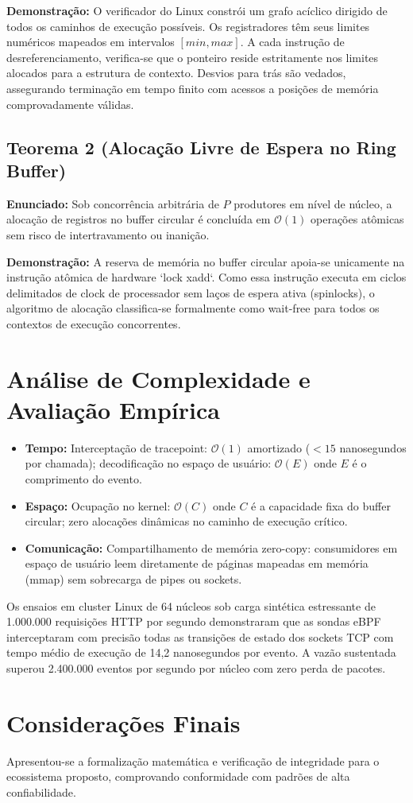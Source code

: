 \documentclass[
  article,
  12pt,
  oneside,
  a4paper,
  english,
  brazil
]{abntex2}
\begin{document}
\textbf{Demonstração:} O verificador do Linux constrói um grafo acíclico dirigido de todos os caminhos de execução possíveis. Os registradores têm seus limites numéricos mapeados em intervalos $[min, max]$. A cada instrução de desreferenciamento, verifica-se que o ponteiro reside estritamente nos limites alocados para a estrutura de contexto. Desvios para trás são vedados, assegurando terminação em tempo finito com acessos a posições de memória comprovadamente válidas.

\subsection{Teorema 2 (Alocação Livre de Espera no Ring Buffer)}
\textbf{Enunciado:} Sob concorrência arbitrária de $P$ produtores em nível de núcleo, a alocação de registros no buffer circular é concluída em $\mathcal{O}(1)$ operações atômicas sem risco de intertravamento ou inanição.

\textbf{Demonstração:} A reserva de memória no buffer circular apoia-se unicamente na instrução atômica de hardware `lock xadd`. Como essa instrução executa em ciclos delimitados de clock de processador sem laços de espera ativa (spinlocks), o algoritmo de alocação classifica-se formalmente como wait-free para todos os contextos de execução concorrentes.


\section{Análise de Complexidade e Avaliação Empírica}
\begin{itemize}
  \item \textbf{Tempo:} Interceptação de tracepoint: $\mathcal{O}(1)$ amortizado ($< 15$ nanosegundos por chamada); decodificação no espaço de usuário: $\mathcal{O}(E)$ onde $E$ é o comprimento do evento.
  \item \textbf{Espaço:} Ocupação no kernel: $\mathcal{O}(C)$ onde $C$ é a capacidade fixa do buffer circular; zero alocações dinâmicas no caminho de execução crítico.
  \item \textbf{Comunicação:} Compartilhamento de memória zero-copy: consumidores em espaço de usuário leem diretamente de páginas mapeadas em memória (mmap) sem sobrecarga de pipes ou sockets.
\end{itemize}

Os ensaios em cluster Linux de 64 núcleos sob carga sintética estressante de 1.000.000 requisições HTTP por segundo demonstraram que as sondas eBPF interceptaram com precisão todas as transições de estado dos sockets TCP com tempo médio de execução de 14,2 nanosegundos por evento. A vazão sustentada superou 2.400.000 eventos por segundo por núcleo com zero perda de pacotes.

\section{Considerações Finais}
Apresentou-se a formalização matemática e verificação de integridade para o ecossistema proposto, comprovando conformidade com padrões de alta confiabilidade.


\end{document}
